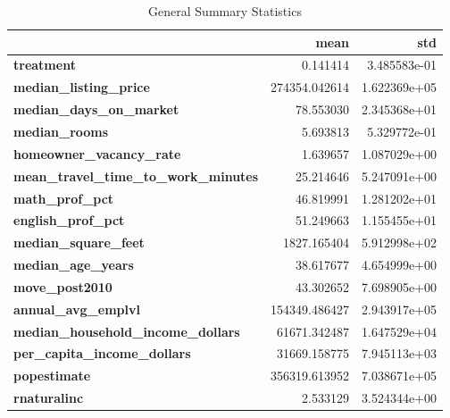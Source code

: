 \begin{table}
    \centering
    \caption{General Summary Statistics}
    \label{general_stats}
    \begin{tabular}{|l||r|r|}
        \hline
        &           mean &           std \\
        \hline
        \hline
        \textbf{treatment                                 } &       0.141414 &  3.485583e-01 \\ \hline
        \textbf{median\_listing\_price                      } &  274354.042614 &  1.622369e+05 \\ \hline
        \textbf{median\_days\_on\_market                     } &      78.553030 &  2.345368e+01 \\ \hline
        \textbf{median\_rooms                              } &       5.693813 &  5.329772e-01 \\ \hline
        \textbf{homeowner\_vacancy\_rate                    } &       1.639657 &  1.087029e+00 \\ \hline
        \textbf{mean\_travel\_time\_to\_work\_minutes          } &      25.214646 &  5.247091e+00 \\ \hline
        \textbf{math\_prof\_pct                             } &      46.819991 &  1.281202e+01 \\ \hline
        \textbf{english\_prof\_pct                          } &      51.249663 &  1.155455e+01 \\ \hline
        \textbf{median\_square\_feet                        } &    1827.165404 &  5.912998e+02 \\ \hline
        \textbf{median\_age\_years                          } &      38.617677 &  4.654999e+00 \\ \hline
        \textbf{move\_post2010                             } &      43.302652 &  7.698905e+00 \\ \hline
        \textbf{annual\_avg\_emplvl                         } &  154349.486427 &  2.943917e+05 \\ \hline
        \textbf{median\_household\_income\_dollars           } &   61671.342487 &  1.647529e+04 \\ \hline
        \textbf{per\_capita\_income\_dollars                 } &   31669.158775 &  7.945113e+03 \\ \hline
        \textbf{popestimate                               } &  356319.613952 &  7.038671e+05 \\ \hline
        \textbf{rnaturalinc                               } &       2.533129 &  3.524344e+00 \\ \hline

\end{tabular}
\end{table}
